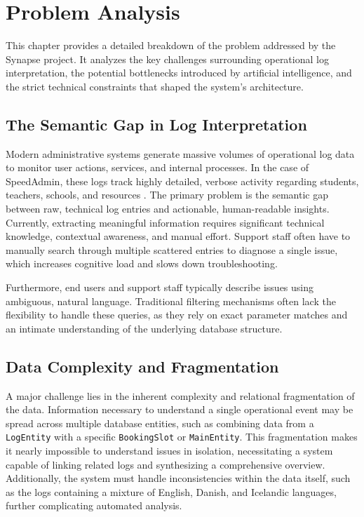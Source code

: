 \section{Problem Analysis}
This chapter provides a detailed breakdown of the problem addressed by the Synapse project. It analyzes the key challenges surrounding operational log interpretation, the potential bottlenecks introduced by artificial intelligence, and the strict technical constraints that shaped the system's architecture.

\subsection{The Semantic Gap in Log Interpretation}
Modern administrative systems generate massive volumes of operational log data to monitor user actions, services, and internal processes. In the case of SpeedAdmin, these logs track highly detailed, verbose activity regarding students, teachers, schools, and resources \cite{speedadmin_dataset}. The primary problem is the semantic gap between raw, technical log entries and actionable, human-readable insights. Currently, extracting meaningful information requires significant technical knowledge, contextual awareness, and manual effort. Support staff often have to manually search through multiple scattered entries to diagnose a single issue, which increases cognitive load and slows down troubleshooting.

Furthermore, end users and support staff typically describe issues using ambiguous, natural language. Traditional filtering mechanisms often lack the flexibility to handle these queries, as they rely on exact parameter matches and an intimate understanding of the underlying database structure.

\subsection{Data Complexity and Fragmentation}
A major challenge lies in the inherent complexity and relational fragmentation of the data. Information necessary to understand a single operational event may be spread across multiple database entities, such as combining data from a \texttt{LogEntity} with a specific \texttt{BookingSlot} or \texttt{MainEntity}. This fragmentation makes it nearly impossible to understand issues in isolation, necessitating a system capable of linking related logs and synthesizing a comprehensive overview. Additionally, the system must handle inconsistencies within the data itself, such as the logs containing a mixture of English, Danish, and Icelandic languages, further complicating automated analysis.

